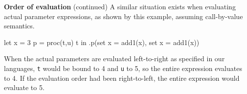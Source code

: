 \begin{minipage}[t]{\sw}
\slidenumber
\LARGE
{\bf Order of evaluation} (continued)\exx
A similar situation exists
when evaluating actual parameter expressions,
as shown by this example, assuming call-by-value semantics.
{\Large
\begin{qv}
let
  x = 3
  p = proc(t,u) t
in
  .p(set x = add1(x), set x = add1(x))
\end{qv}
}
When the actual parameters are evaluated left-to-right
as specified in our languages,
\verb't' would be bound to 4 and \verb'u' to 5,
so the entire expression evaluates to 4.
If the evaluation order had been right-to-left,
the entire expression would evaluate to 5.\exx
\end{minipage}
\clearpage
